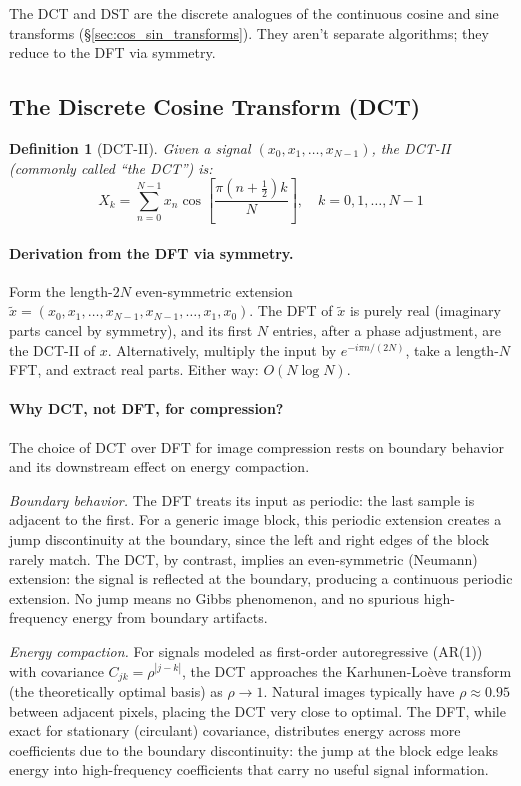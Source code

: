 \documentclass[12pt,a4paper]{report}
\theoremstyle{thms}
\theoremstyle{defns}
\newtheorem{definition}{Definition}[section]
\begin{document}
The DCT and DST are the discrete analogues of the continuous cosine and sine transforms (\S\ref{sec:cos_sin_transforms}). They aren't separate algorithms; they reduce to the DFT via symmetry.

\subsection{The Discrete Cosine Transform (DCT)}

\begin{definition}[DCT-II]
    Given a signal $(x_0, x_1, \ldots, x_{N-1})$, the DCT-II (commonly called ``the DCT'') is:
    \begin{equation}
        X_k = \sum_{n=0}^{N-1} x_n \cos\left[\dfrac{\pi(n + \tfrac{1}{2})k}{N}\right], \quad k = 0, 1, \ldots, N-1
        \label{eq:dct}
    \end{equation}
\end{definition}

\paragraph{Derivation from the DFT via symmetry.} Form the length-$2N$ even-symmetric extension $\tilde{x} = (x_0, x_1, \ldots, x_{N-1}, x_{N-1}, \ldots, x_1, x_0)$. The DFT of $\tilde{x}$ is purely real (imaginary parts cancel by symmetry), and its first $N$ entries, after a phase adjustment, are the DCT-II of $x$. Alternatively, multiply the input by $e^{-i\pi n/(2N)}$, take a length-$N$ FFT, and extract real parts. Either way: $O(N \log N)$.

\paragraph{Why DCT, not DFT, for compression?} The choice of DCT over DFT for image compression rests on boundary behavior and its downstream effect on energy compaction.

\textit{Boundary behavior.} The DFT treats its input as periodic: the last sample is adjacent to the first. For a generic image block, this periodic extension creates a jump discontinuity at the boundary, since the left and right edges of the block rarely match. The DCT, by contrast, implies an even-symmetric (Neumann) extension: the signal is reflected at the boundary, producing a continuous periodic extension. No jump means no Gibbs phenomenon, and no spurious high-frequency energy from boundary artifacts.

\textit{Energy compaction.} For signals modeled as first-order autoregressive (AR(1)) with covariance $C_{jk} = \rho^{|j-k|}$, the DCT approaches the Karhunen-Lo\`{e}ve transform (the theoretically optimal basis) as $\rho \to 1$. Natural images typically have $\rho \approx 0.95$ between adjacent pixels, placing the DCT very close to optimal. The DFT, while exact for stationary (circulant) covariance, distributes energy across more coefficients due to the boundary discontinuity: the jump at the block edge leaks energy into high-frequency coefficients that carry no useful signal information.
\end{document}

